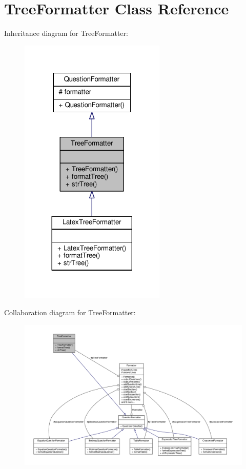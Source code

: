 \hypertarget{classTreeFormatter}{}\section{Tree\+Formatter Class Reference}
\label{classTreeFormatter}


Inheritance diagram for Tree\+Formatter\+:
\nopagebreak
\begin{figure}[H]
\begin{center}
\leavevmode
\includegraphics[width=197pt]{classTreeFormatter__inherit__graph}
\end{center}
\end{figure}


Collaboration diagram for Tree\+Formatter\+:
\nopagebreak
\begin{figure}[H]
\begin{center}
\leavevmode
\includegraphics[width=350pt]{classTreeFormatter__coll__graph}
\end{center}
\end{figure}
